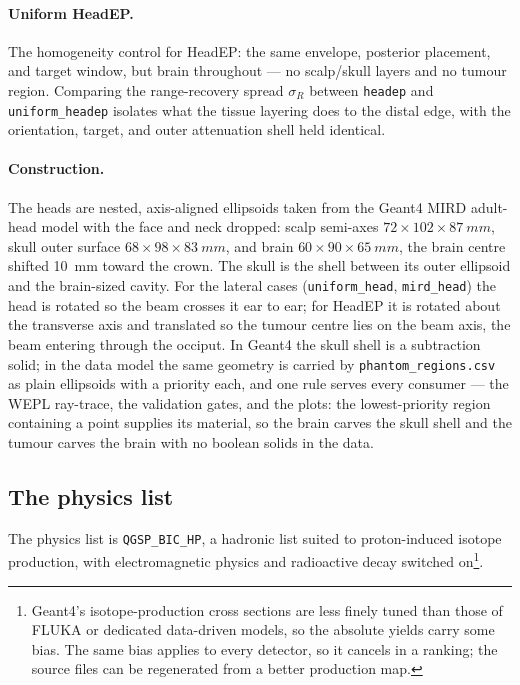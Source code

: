 \documentclass[11pt]{article}
\newcommand{\file}[1]{\texttt{#1}}
\begin{document}
\paragraph{Uniform HeadEP.} The homogeneity control for HeadEP: the same
envelope, posterior placement, and target window, but brain throughout ---
no scalp/skull layers and no tumour region. Comparing the range-recovery
spread $\sigma_R$ between \file{headep} and \file{uniform\_headep} isolates
what the tissue layering does to the distal edge, with the orientation,
target, and outer attenuation shell held identical.

\paragraph{Construction.} The heads are nested, axis-aligned ellipsoids taken
from the Geant4 MIRD adult-head model with the face and neck dropped: scalp
semi-axes $72\times102\times\SI{87}{mm}$, skull outer surface
$68\times98\times\SI{83}{mm}$, and brain $60\times90\times\SI{65}{mm}$, the
brain centre shifted \SI{10}{mm} toward the crown. The skull is the shell
between its outer ellipsoid and the brain-sized cavity. For the lateral cases
(\file{uniform\_head}, \file{mird\_head}) the head is rotated so the beam
crosses it ear to ear; for HeadEP it is rotated about the transverse axis and
translated so the tumour centre lies on the beam axis, the beam entering
through the occiput. In Geant4 the skull shell is a subtraction solid; in the
data model the same geometry is carried by \file{phantom\_regions.csv} as plain
ellipsoids with a priority each, and one rule serves every consumer --- the
WEPL ray-trace, the validation gates, and the plots: the lowest-priority
region containing a point supplies its material, so the brain carves the skull
shell and the tumour carves the brain with no boolean solids in the data.

\subsection{The physics list}
\label{sec:physics}
The physics list is \file{QGSP\_BIC\_HP}, a hadronic list suited to proton-induced
isotope production, with electromagnetic physics and radioactive decay switched
on\footnote{Geant4's isotope-production cross sections are less finely tuned than
those of FLUKA or dedicated data-driven models, so the absolute yields carry some
bias. The same bias applies to every detector, so it cancels in a ranking; the
source files can be regenerated from a better production map.}.
\end{document}
